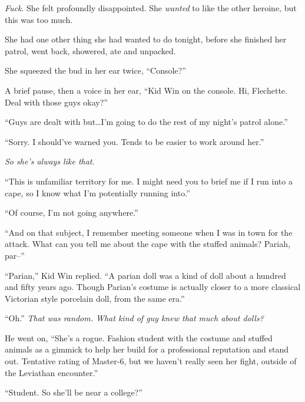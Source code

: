 \emph{Fuck}.  She felt profoundly disappointed.  She \emph{wanted} to like the other heroine, but this was too much.



She had one other thing she had wanted to do tonight, before she finished her patrol, went back, showered, ate and unpacked.



She squeezed the bud in her ear twice, ``Console?''



A brief pause, then a voice in her ear, ``Kid Win on the console.  Hi, Flechette.  Deal with those guys okay?''



``Guys are dealt with but\ldots I'm going to do the rest of my night's patrol alone.''



``Sorry.  I should've warned you.  Tends to be easier to work around her.''



\emph{So she's always like that}.



``This is unfamiliar territory for me. I might need you to brief me if I run into a cape, so I know what I'm potentially running into.''



``Of course, I'm not going anywhere.''



``And on that subject, I remember meeting someone when I was in town for the attack.  What can you tell me about the cape with the stuffed animals?  Pariah, par--''



``Parian,'' Kid Win replied.  ``A parian doll was a kind of doll about a hundred and fifty years ago.  Though Parian's costume is actually closer to a more classical Victorian style porcelain doll, from the same era.''



``Oh.''  \emph{That was random.  What kind of guy knew that much about dolls?}



He went on, ``She's a rogue.  Fashion student with the costume and stuffed animals as a gimmick to help her build for a professional reputation and stand out.  Tentative rating of Master-6, but we haven't really seen her fight, outside of the Leviathan encounter.''



``Student.  So she'll be near a college?''



